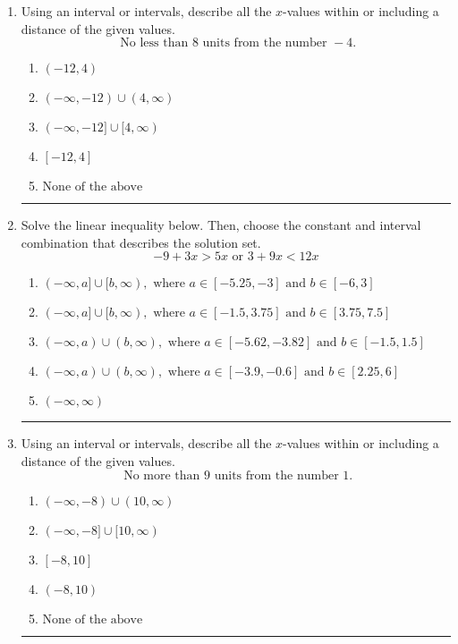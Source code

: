 \documentclass[14pt]{extbook}
\newcommand{\litem}[1]{\item#1\hspace*{-1cm}\rule{\textwidth}{0.4pt}}
\begin{document}
\begin{enumerate}
{\begin{enumerate}[label=\Alph*.]
\end{enumerate} }
\litem{
Using an interval or intervals, describe all the $x$-values within or including a distance of the given values.\[ \text{ No less than } 8 \text{ units from the number } -4. \]\begin{enumerate}[label=\Alph*.]
\item \( (-12, 4) \)
\item \( (-\infty, -12) \cup (4, \infty) \)
\item \( (-\infty, -12] \cup [4, \infty) \)
\item \( [-12, 4] \)
\item \( \text{None of the above} \)

\end{enumerate} }
\litem{
Solve the linear inequality below. Then, choose the constant and interval combination that describes the solution set.\[ -9 + 3 x > 5 x \text{ or } 3 + 9 x < 12 x \]\begin{enumerate}[label=\Alph*.]
\item \( (-\infty, a] \cup [b, \infty), \text{ where } a \in [-5.25, -3] \text{ and } b \in [-6, 3] \)
\item \( (-\infty, a] \cup [b, \infty), \text{ where } a \in [-1.5, 3.75] \text{ and } b \in [3.75, 7.5] \)
\item \( (-\infty, a) \cup (b, \infty), \text{ where } a \in [-5.62, -3.82] \text{ and } b \in [-1.5, 1.5] \)
\item \( (-\infty, a) \cup (b, \infty), \text{ where } a \in [-3.9, -0.6] \text{ and } b \in [2.25, 6] \)
\item \( (-\infty, \infty) \)

\end{enumerate} }
\litem{
Using an interval or intervals, describe all the $x$-values within or including a distance of the given values.\[ \text{ No more than } 9 \text{ units from the number } 1. \]\begin{enumerate}[label=\Alph*.]
\item \( (-\infty, -8) \cup (10, \infty) \)
\item \( (-\infty, -8] \cup [10, \infty) \)
\item \( [-8, 10] \)
\item \( (-8, 10) \)
\item \( \text{None of the above} \)


\end{enumerate}}
\end{enumerate}
\end{document}
